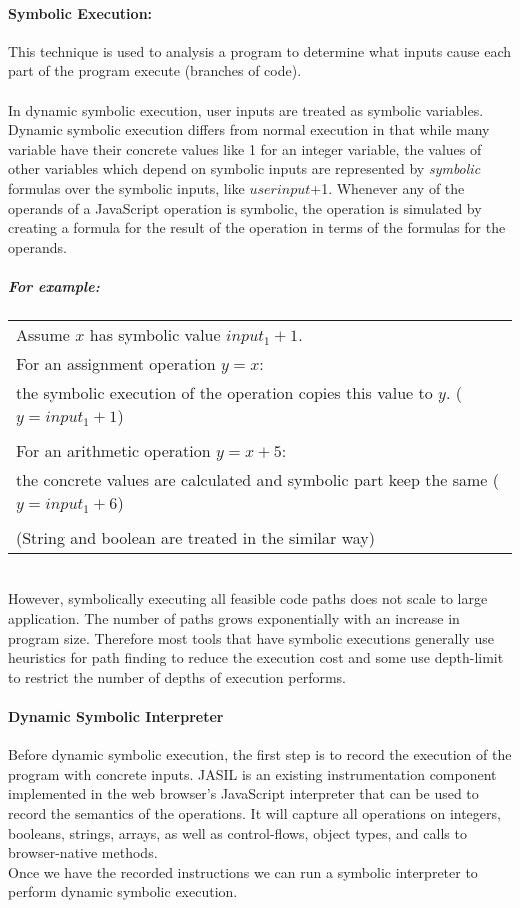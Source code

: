 \documentclass[11pt]{article}
\begin{document}
\paragraph{Symbolic Execution:} This technique is used to analysis a program to determine what inputs cause each part of the program execute (branches of code).\\ \\
In dynamic symbolic execution, user inputs are treated as symbolic variables. Dynamic symbolic execution differs from normal execution in that while many variable have their concrete values like 1 for an integer variable, the values of other variables which depend on symbolic inputs are represented by \textit{symbolic} formulas over the symbolic inputs, like $userinput$+1. Whenever any of the operands of a JavaScript operation is symbolic, the operation is simulated by creating a formula for the result of the operation in terms of the formulas for the operands.  
\subparagraph{For example:}
\begin{center}
\begin{tabular}{ |p{15cm}| } 
 \hline
Assume $x$ has symbolic value $input_{1}+1$. \\
For an assignment operation $y = x$:\\
\qquad the symbolic execution of the operation copies this value to $y$. ($y=input_{1}+1$)\\ \\
For an arithmetic operation $y = x + 5$:\\
\qquad the concrete values are calculated and symbolic part keep the same ($y=input_{1}+6$) \\ \\
(String and boolean are treated in the similar way) \\
\hline
\end{tabular}
\end{center}
\phantom \\
However, symbolically executing all feasible code paths does not scale to large application. The number of paths grows exponentially with an increase in program size. Therefore most tools that have symbolic executions generally use heuristics for path finding to reduce the execution cost and some use depth-limit to restrict the number of depths of execution performs.
\paragraph{Dynamic Symbolic Interpreter}
Before dynamic symbolic execution, the first step is to record the execution of the program with concrete inputs. JASIL\cite{JASIL} is an existing instrumentation component implemented in the web browser's JavaScript interpreter that can be used to record the semantics of the operations. It will capture all operations on integers, booleans, strings, arrays, as well as control-flows, object types, and calls to browser-native methods. \\
Once we have the recorded instructions we can run a symbolic interpreter to perform dynamic symbolic execution.
\newpage
\end{document}
